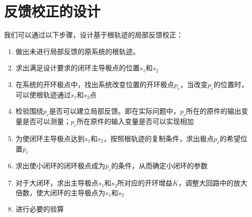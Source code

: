 \section{反馈校正的设计}

我们可以通过以下步骤，设计基于根轨迹的局部反馈校正：
\begin{enumerate}
    \item 做出未进行局部反馈的原系统的根轨迹。
    \item 求出满足设计要求的闭环主导极点的位置$s_1$和$s_2$
    \item 在系统的开环极点中，找出系统改变位置的开环极点$p_c$，当改变$p_c$的位置时，可以使根轨迹通过$s_1$和$s_2$点
    \item 检验围绕$p_c$是否可以建立局部反馈。即在实际问题中，$p_c$所在的原件的输出变量是否可以测量；$p_c$所在原件的输入变量是否可以实现相加
    \item 为使闭环主导极点达到$s_1$和$s_2$，按照根轨迹的复制条件，求出极点$p_c$的希望位置$\overline{p}_c$
    \item 求出使小闭环的闭环极点成为$\overline{p}_c$的条件，从而确定小闭环的参数
    \item 对于大闭环，求出主导极点$s_1$和$s_2$所对应的开环增益$K$，调整大回路中的放大倍数，使大闭环的主导极点为$s_1$和$s_2$
    \item 进行必要的验算
\end{enumerate}
